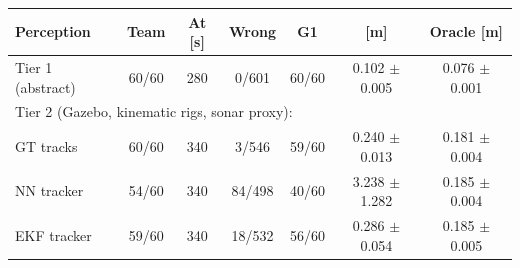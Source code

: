 \begin{tabular}{lcccccc}
\toprule
Perception & Team & At [s] & Wrong & G1 & \avatar{} [m] & Oracle [m] \\
\midrule
Tier 1 (abstract) & 60/60 & 280 & 0/601 & 60/60 & 0.102 $\pm$ 0.005 & 0.076 $\pm$ 0.001 \\
\multicolumn{7}{l}{Tier 2 (Gazebo, kinematic rigs, sonar proxy):} \\
\quad GT tracks & 60/60 & 340 & 3/546 & 59/60 & 0.240 $\pm$ 0.013 & 0.181 $\pm$ 0.004 \\
\quad NN tracker & 54/60 & 340 & 84/498 & 40/60 & 3.238 $\pm$ 1.282 & 0.185 $\pm$ 0.004 \\
\quad EKF tracker & 59/60 & 340 & 18/532 & 56/60 & 0.286 $\pm$ 0.054 & 0.185 $\pm$ 0.005 \\
\bottomrule
\end{tabular}

